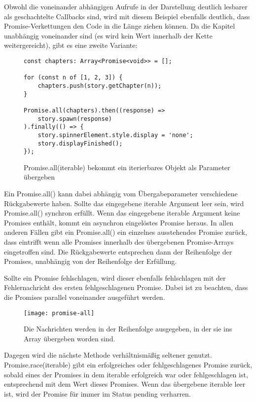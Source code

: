 \noindent
Obwohl die voneinander abhängigen Aufrufe in der Darstellung deutlich lesbarer als geschachtelte Callbacks sind, wird mit diesem Beispiel ebenfalls deutlich, dass Promise-Verkettungen den Code in die Länge ziehen können. Da die Kapitel unabhängig voneinander sind (es wird kein Wert innerhalb der Kette weitergereicht), gibt es eine zweite Variante: 

\begin{figure}[H]
\begin{lstlisting}[basicstyle=\small]
const chapters: Array<Promise<void>> = [];

for (const n of [1, 2, 3]) {
    chapters.push(story.getChapter(n));
}

Promise.all(chapters).then((response) =>
    story.spawn(response)
).finally(() => {
    story.spinnerElement.style.display = 'none';
    story.displayFinished();
});
\end{lstlisting}
\caption{Promise.all(iterable) bekommt ein iterierbares Objekt als Parameter übergeben}
\end{figure}

\noindent
Ein Promise.all() kann dabei abhängig vom Übergabeparameter verschiedene Rückgabewerte haben. Sollte das eingegebene iterable Argument leer sein, wird Promise.all() synchron erfüllt. Wenn das eingegebene iterable Argument keine Promises enthält, kommt ein asynchron eingelöstes Promise heraus. In allen anderen Fällen gibt ein Promise.all() ein einzelnes ausstehendes Promise zurück, dass eintrifft wenn alle Promises innerhalb des übergebenen Promise-Arrays eingetroffen sind. Die Rückgabewerte entsprechen dann der Reihenfolge der Promises, unabhängig von der Reihenfolge der Erfüllung.\cite{promise-all}

\noindent
Sollte ein Promise fehlschlagen, wird dieser ebenfalls fehlschlagen mit der Fehlernachricht des ersten fehlgeschlagenen Promise.\cite{promise-executor} Dabei ist zu beachten, dass die Promises parallel voneinander ausgeführt werden.

\begin{figure}[H]
\centering
\texttt{[image: promise-all]}
\caption{Die Nachrichten werden in der Reihenfolge ausgegeben, in der sie ins Array übergeben worden sind.}
\end{figure}

\noindent
Dagegen wird die nächste Methode verhältnismäßig seltener genutzt. 
Promise.race(iterable) gibt ein erfolgreiches oder fehlgeschlagenes Promise zurück, sobald eines der Promises in dem iterable erfolgreich war oder fehlgeschlagen ist, entsprechend mit dem Wert dieses Promises.
Wenn das übergebene iterable leer ist, wird der Promise für immer im Status pending verharren.\cite{promise-race}


